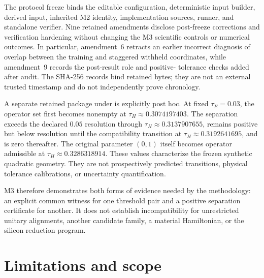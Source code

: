 The protocol freeze binds the editable configuration, deterministic input
builder, derived input, inherited M2 identity, implementation sources, runner,
and standalone verifier. Nine retained amendments disclose post-freeze
corrections and verification hardening without changing the M3 scientific
controls or numerical outcomes. In particular, amendment~6 retracts an earlier
incorrect diagnosis of overlap between the training and staggered withheld
coordinates, while amendment~9 records the post-result role and positive-
tolerance checks added after audit. The SHA-256 records bind retained bytes;
they are not an external trusted timestamp and do not independently prove
chronology.

A separate retained package under
 is explicitly post
hoc. At fixed $\tau_E=0.03$, the operator set first becomes nonempty at
$\tau_H\approx0.3074197403$. The separation exceeds the declared $0.05$
resolution through $\tau_H\approx0.3137907655$, remains positive but below
resolution until the compatibility transition at
$\tau_H\approx0.3192641695$, and is zero thereafter. The original parameter
$(0,1)$ itself becomes operator admissible at
$\tau_H\approx0.3286318914$. These values characterize the frozen synthetic
quadratic geometry. They are not prospectively predicted transitions, physical
tolerance calibrations, or uncertainty quantification.

M3 therefore demonstrates both forms of evidence needed by the methodology:
an explicit common witness for one threshold pair and a positive separation
certificate for another. It does not establish incompatibility for unrestricted
unitary alignments, another candidate family, a material Hamiltonian, or the
silicon reduction program.

\section{Limitations and scope}

